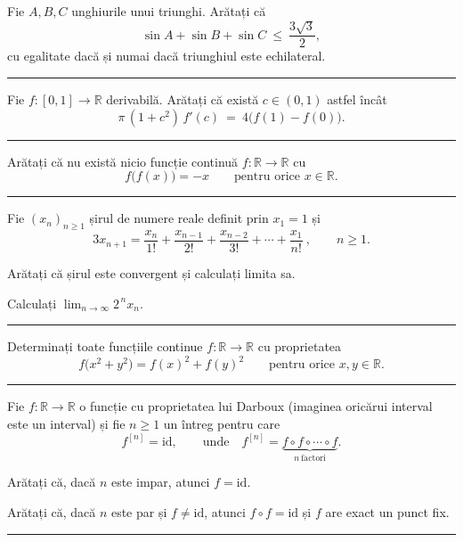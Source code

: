Fie $A,B,C$ unghiurile unui triunghi. Arătați că
\[ \sin A+\sin B+\sin C\ \le\ \frac{3\sqrt3}{2} , \]
cu egalitate dacă și numai dacă triunghiul este echilateral.
\vspace{1mm}\hrule

Fie $f:[0,1]\to\mathbb{R}$ derivabilă. Arătați că există $c\in(0,1)$ astfel încât
\[ \pi\,(1+c^{2})\,f'(c)\ =\ 4\bigl(f(1)-f(0)\bigr) . \]
\vspace{1mm}\hrule

Arătați că nu există nicio funcție continuă $f:\mathbb{R}\to\mathbb{R}$ cu
\[ f\bigl(f(x)\bigr)=-x\qquad\text{pentru orice }x\in\mathbb{R} . \]
\vspace{1mm}\hrule

Fie $(x_n)_{n\ge1}$ șirul de numere reale definit prin $x_1=1$ și
\[ 3x_{n+1}=\frac{x_n}{1!}+\frac{x_{n-1}}{2!}+\frac{x_{n-2}}{3!}+\cdots+\frac{x_1}{n!}\ ,\qquad n\ge1 . \]
\begin{parti}
  \item Arătați că șirul este convergent și calculați limita sa.
  \item Calculați $\displaystyle\lim_{n\to\infty}2^{\,n}x_n$.
\end{parti}
\vspace{1mm}\hrule

Determinați toate funcțiile continue $f:\mathbb{R}\to\mathbb{R}$ cu proprietatea
\[ f\bigl(x^{2}+y^{2}\bigr)=f(x)^{2}+f(y)^{2}\qquad\text{pentru orice }x,y\in\mathbb{R}. \]
\vspace{1mm}\hrule

Fie $f:\mathbb{R}\to\mathbb{R}$ o funcție cu proprietatea lui Darboux (imaginea oricărui interval este un interval) și fie $n\ge1$ un întreg pentru care
\[ f^{[n]}=\mathrm{id},\qquad\text{unde}\quad f^{[n]}=\underbrace{f\circ f\circ\cdots\circ f}_{n\ \text{factori}} . \]
\begin{parti}
  \item Arătați că, dacă $n$ este impar, atunci $f=\mathrm{id}$.
  \item Arătați că, dacă $n$ este par și $f\neq\mathrm{id}$, atunci $f\circ f=\mathrm{id}$ și $f$ are exact un punct fix.
\end{parti}
\vspace{1mm}\hrule

